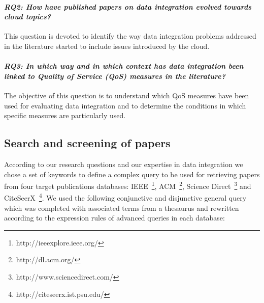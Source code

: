 \paragraph{\textit{\textbf{RQ2:}  How have published papers on data
 integration evolved towards cloud topics?}} This question is devoted to identify the way  data integration problems addressed in the literature started  to include issues introduced by the cloud.

\paragraph{\textit{\textbf{RQ3:} In which way and in which  context has data integration  been linked to Quality of Service (QoS) measures in the literature?}} The objective of this question is to understand which QoS measures have been used for evaluating data integration and to determine the conditions in which  specific measures are particularly used.

\subsection{Search and screening of papers} \label{subsec:search}

According to our research questions and our expertise in data integration we chose a set of keywords to define a complex query to be used for retrieving papers from four target publications databases: IEEE~\footnote{http://ieeexplore.ieee.org/},
ACM~\footnote{http://dl.acm.org/}, Science Direct~\footnote{http://www.sciencedirect.com/} and
CiteSeerX~\footnote{http://citeseerx.ist.psu.edu/}. We used the following conjunctive and disjunctive general query which was completed with associated terms from a thesaurus and rewritten according to the expression rules of advanced queries in each database: 


